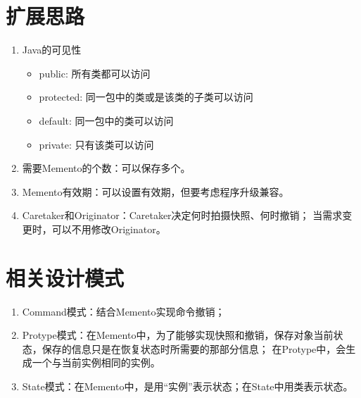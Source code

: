 \section{扩展思路}
\begin{enumerate}
	\item Java的可见性
	\begin{itemize}
		\item public: 所有类都可以访问
		\item protected: 同一包中的类或是该类的子类可以访问
		\item default: 同一包中的类可以访问
		\item private: 只有该类可以访问
	\end{itemize}
	\item 需要Memento的个数：可以保存多个。
	\item Memento有效期：可以设置有效期，但要考虑程序升级兼容。
	\item Caretaker和Originator：Caretaker决定何时拍摄快照、何时撤销；
	当需求变更时，可以不用修改Originator。
\end{enumerate}
\section{相关设计模式}
\begin{enumerate}
	\item Command模式：结合Memento实现命令撤销；
	\item Protype模式：在Memento中，为了能够实现快照和撤销，保存对象当前状态，保存的信息只是在恢复状态时所需要的那部分信息；
	在Protype中，会生成一个与当前实例相同的实例。
	\item State模式：在Memento中，是用“实例”表示状态；在State中用类表示状态。
\end{enumerate}